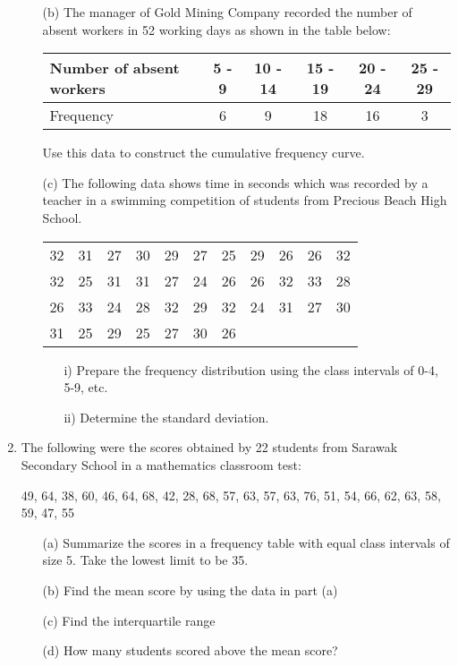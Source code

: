\begin{enumerate}
\begin{enumerate}[topsep=0ex,itemsep=0ex,partopsep=1ex,parsep=1ex]
		\item[(b)] The manager of Gold Mining Company recorded the number of absent workers in 52 working days as shown in the table below:
		\begin{center}
			\begin{tabular}{|l|c|c|c|c|c|} \hline
				Number of absent workers & 5 - 9 & 10 - 14 & 15 - 19 & 20 - 24 & 25 - 29 \\ \hline
				Frequency & 6 & 9 & 18 & 16 & 3 \\ \hline
			\end{tabular}
		\end{center}
		Use this data to construct the cumulative frequency curve.
		
		\item[(c)] The following data shows time in seconds which was recorded by a teacher in a swimming competition of students from Precious Beach High School.
		\begin{center}
			\begin{tabular}{ccccccccccc}
				32 & 31 & 27 & 30 & 29 & 27 & 25 & 29 & 26 & 26 & 32 \\
				32 & 25 & 31 & 31 & 27 & 24 & 26 & 26 & 32 & 33 & 28 \\
				26 & 33 & 24 & 28 & 32 & 29 & 32 & 24 & 31 & 27 & 30 \\
				31 & 25 & 29 & 25 & 27 & 30 & 26 \\
			\end{tabular}
		\end{center}
		\begin{enumerate}[topsep=0ex,itemsep=0ex,partopsep=1ex,parsep=1ex]
			\item[i)] Prepare the frequency distribution using the class intervals of 0-4, 5-9, etc. 
			\item[ii)] Determine the standard deviation. 
		\end{enumerate}
	\end{enumerate}
	
	\item The following were the scores obtained by 22 students from Sarawak Secondary School in a mathematics classroom test: 
	\begin{center}
		49, 64, 38, 60, 46, 64, 68, 42, 28, 68, 57, 63, 57, 63, 76, 51, 54, 66, 62, 63, 58, 59, 47, 55
	\end{center}
	\begin{enumerate}[topsep=0ex,itemsep=0ex,partopsep=1ex,parsep=1ex]
		\item[(a)] Summarize the scores in a frequency table with equal class intervals of size 5. Take the lowest limit to be 35. 
		\item[(b)] Find the mean score by using the data in part (a)
		\item[(c)] Find the interquartile range
		\item[(d)] How many students scored above the mean score?
	\end{enumerate}
	
\end{enumerate}













